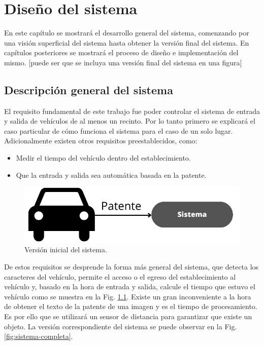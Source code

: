\chapter{Diseño del sistema}

En este capítulo se mostrará el desarrollo general del sistema, comenzando por una visión superficial del sistema hasta obtener la versión final del sistema. En capítulos posteriores se mostrará el proceso de diseño e implementación del mismo. [puede ser que se incluya una versión final del sistema en una figura]

\section{Descripción general del sistema}

El requisito fundamental de este trabajo fue poder controlar el sistema de entrada y salida de vehículos de al menos un recinto. Por lo tanto primero se explicará el caso particular de cómo funciona el sistema para el caso de un solo lugar. Adicionalmente existen otros requisitos preestablecidos, como:

\begin{itemize}
    \item Medir el tiempo del vehículo dentro del establecimiento.
    \item Que la entrada y salida sea automática basada en la patente.
\end{itemize}

\begin{figure}
    \centering
    \includegraphics[width=.8\textwidth]{imgs/sistema-base.png}
    \caption{Versión inicial del sistema.}
    \label{fig:sistema-base}
\end{figure}

De estos requisitos se desprende la forma más general del sistema, que detecta los caracteres del vehículo, permite el acceso o el egreso del establecimiento al vehículo y, basado en la hora de entrada y salida, calcule el tiempo que estuvo el vehículo como se muestra en la Fig. \ref{fig:sistema-base}.
Existe un gran inconveniente a la hora de obtener el texto de la patente de una imagen y es el tiempo de procesamiento. Es por ello que se utilizará un sensor de distancia para garantizar que existe un objeto.
La versión correspondiente del sistema se puede observar en la Fig. \ref{fig:sistema-completa}.

